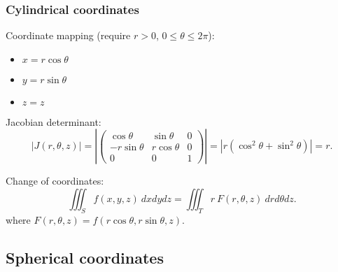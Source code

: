\documentclass[aspectratio=169,handout]{beamer}
\newcommand{\abs}[1]{\left|#1\right|} %
\begin{document}
\begin{frame}
    \frametitle{Cylindrical coordinates}



    Coordinate mapping (require \(r>0\), \(0\leq \theta \leq 2\pi\)):
    \begin{itemize}
        \item \(x = r \cos \theta\)
        \item \(y = r \sin \theta\)
        \item \(z = z\)
    \end{itemize}



    Jacobian determinant:
    \[
        \abs{J(r,\theta,z)}
        = 
        \abs{\begin{pmatrix}
        \cos \theta  & \sin \theta  & 0 \\
        -r \sin \theta  & r \cos \theta & 0 \\
        0 & 0 & 1
        \end{pmatrix}}
        = 
        \abs{r (\cos^2 \theta + \sin^2 \theta)}
        = r.
    \]

    Change of coordinates:
    \[
        \iiint_{S} f(x,y,z) \ dxdydz =  \iiint_{T} r \ F(r,\theta,z)   \ dr d\theta dz.
    \]
    where \( F(r,\theta,z) = f(r \cos \theta, r \sin \theta,  z) \).

\end{frame}


\subsection{Spherical coordinates}
\end{document}
